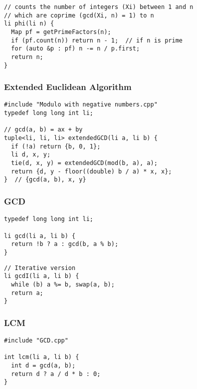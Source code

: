 \documentclass[twoside]{article}
\begin{document}
\begin{multicols*}{2}
\begin{verbatim}
// counts the number of integers (Xi) between 1 and n
// which are coprime (gcd(Xi, n) = 1) to n
li phi(li n) {
  Map pf = getPrimeFactors(n);
  if (pf.count(n)) return n - 1;  // if n is prime
  for (auto &p : pf) n -= n / p.first;
  return n;
}
\end{verbatim}

\subsubsectionfont{\large\bfseries\sffamily\underline}
\subsubsection*{Extended Euclidean Algorithm}
\begin{verbatim}
#include "Modulo with negative numbers.cpp"
typedef long long int li;

// gcd(a, b) = ax + by
tuple<li, li, li> extendedGCD(li a, li b) {
  if (!a) return {b, 0, 1};
  li d, x, y;
  tie(d, x, y) = extendedGCD(mod(b, a), a);
  return {d, y - floor((double) b / a) * x, x};
}  // {gcd(a, b), x, y}
\end{verbatim}

\subsubsectionfont{\large\bfseries\sffamily\underline}
\subsubsection*{GCD}
\begin{verbatim}
typedef long long int li;

li gcd(li a, li b) {
  return !b ? a : gcd(b, a % b);
}
\end{verbatim}
\vspace{-12pt}
\begin{verbatim}
// Iterative version
li gcdI(li a, li b) {
  while (b) a %= b, swap(a, b);
  return a;
}
\end{verbatim}

\subsubsectionfont{\large\bfseries\sffamily\underline}
\subsubsection*{LCM}
\begin{verbatim}
#include "GCD.cpp"

int lcm(li a, li b) {
  int d = gcd(a, b);
  return d ? a / d * b : 0;
}
\end{verbatim}


\end{multicols*}
\end{document}
